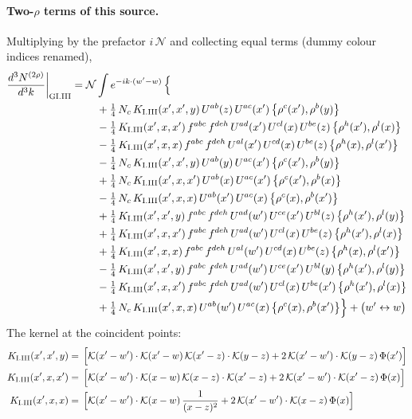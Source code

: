 \documentclass[10pt]{article}
\numberwithin{equation}{section}
\newcommand{\KK}{\mathcal K}
\newcommand{\NN}{\mathcal N}
\begin{document}
\paragraph{Two-$\rho$ terms of this source.} Multiplying by the prefactor $i\,\NN$ and collecting equal terms (dummy colour indices renamed),
\begin{align}
\frac{d^3N^{(2\rho)}}{d^3k}\bigg|_{\rm GI.III}={}&\NN\int e^{-ik\cdot(w'-w)}\,\Big\{\notag\\
&\quad +\tfrac14\,N_{c}\,K_{\rm I.III}(x',x',y)\,U^{ab}(z)\,U^{ac}(x')\,\big\{\rho^{c}(x'),\rho^{b}(y)\big\}\notag\\
&\quad -\tfrac14\,K_{\rm I.III}(x',x,x')\,f^{abc}\,f^{deh}\,U^{ad}(x')\,U^{cl}(x)\,U^{be}(z)\,\big\{\rho^{h}(x'),\rho^{l}(x)\big\}\notag\\
&\quad -\tfrac14\,K_{\rm I.III}(x',x,x)\,f^{abc}\,f^{deh}\,U^{al}(x')\,U^{cd}(x)\,U^{be}(z)\,\big\{\rho^{h}(x),\rho^{l}(x')\big\}\notag\\
&\quad -\tfrac14\,N_{c}\,K_{\rm I.III}(x',x',y)\,U^{ab}(y)\,U^{ac}(x')\,\big\{\rho^{c}(x'),\rho^{b}(y)\big\}\notag\\
&\quad +\tfrac14\,N_{c}\,K_{\rm I.III}(x',x,x')\,U^{ab}(x)\,U^{ac}(x')\,\big\{\rho^{c}(x'),\rho^{b}(x)\big\}\notag\\
&\quad -\tfrac14\,N_{c}\,K_{\rm I.III}(x',x,x)\,U^{ab}(x')\,U^{ac}(x)\,\big\{\rho^{c}(x),\rho^{b}(x')\big\}\notag\\
&\quad +\tfrac14\,K_{\rm I.III}(x',x',y)\,f^{abc}\,f^{deh}\,U^{ad}(w')\,U^{ce}(x')\,U^{bl}(z)\,\big\{\rho^{h}(x'),\rho^{l}(y)\big\}\notag\\
&\quad +\tfrac14\,K_{\rm I.III}(x',x,x')\,f^{abc}\,f^{deh}\,U^{ad}(w')\,U^{cl}(x)\,U^{be}(z)\,\big\{\rho^{h}(x'),\rho^{l}(x)\big\}\notag\\
&\quad +\tfrac14\,K_{\rm I.III}(x',x,x)\,f^{abc}\,f^{deh}\,U^{al}(w')\,U^{cd}(x)\,U^{be}(z)\,\big\{\rho^{h}(x),\rho^{l}(x')\big\}\notag\\
&\quad -\tfrac14\,K_{\rm I.III}(x',x',y)\,f^{abc}\,f^{deh}\,U^{ad}(w')\,U^{ce}(x')\,U^{bl}(y)\,\big\{\rho^{h}(x'),\rho^{l}(y)\big\}\notag\\
&\quad -\tfrac14\,K_{\rm I.III}(x',x,x')\,f^{abc}\,f^{deh}\,U^{ad}(w')\,U^{cl}(x)\,U^{be}(x')\,\big\{\rho^{h}(x'),\rho^{l}(x)\big\}\notag\\
&\quad +\tfrac14\,N_{c}\,K_{\rm I.III}(x',x,x)\,U^{ab}(w')\,U^{ac}(x)\,\big\{\rho^{c}(x),\rho^{b}(x')\big\}\Big\}+\big(w'\leftrightarrow w\big)\label{eq:res-GI.III}
\end{align}
The kernel at the coincident points:
\begin{align*}
K_{\rm I.III}(x',x',y)&=\,\Big[\KK(x'-w')\cdot\KK(x'-w)\,\KK(x'-z)\cdot\KK(y-z)+2\,\KK(x'-w')\cdot\KK(y-z)\,\Phi(x')\Big]\\K_{\rm I.III}(x',x,x')&=\,\Big[\KK(x'-w')\cdot\KK(x-w)\,\KK(x-z)\cdot\KK(x'-z)+2\,\KK(x'-w')\cdot\KK(x'-z)\,\Phi(x)\Big]\\K_{\rm I.III}(x',x,x)&=\,\Big[\KK(x'-w')\cdot\KK(x-w)\,\frac{1}{(x-z)^2}+2\,\KK(x'-w')\cdot\KK(x-z)\,\Phi(x)\Big]
\end{align*}
\end{document}
